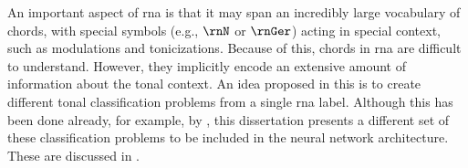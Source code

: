 
An important aspect of \gls{rna} is that it may span an
incredibly large vocabulary of chords, with special symbols
(e.g., $\rnN$ or $\rnGer$) acting in special context, such
as modulations and tonicizations. Because of this, chords in
\gls{rna} are difficult to understand. However, they
implicitly encode an extensive amount of information about
the tonal context. An idea proposed in this \thesisdiss{} is
to create different tonal classification problems from a
single \gls{rna} label. Although this has been done already,
for example, by \textcite{chen2018functional}, this
dissertation presents a different set of these
classification problems to be included in the neural network
architecture. These are discussed in
.
